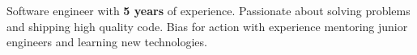 
\begin{description}
	\item \quad \quad Software engineer with \textbf{5 years} of experience. Passionate about solving problems and shipping high quality code. Bias for action with experience mentoring junior engineers and learning new technologies.
\end{description}